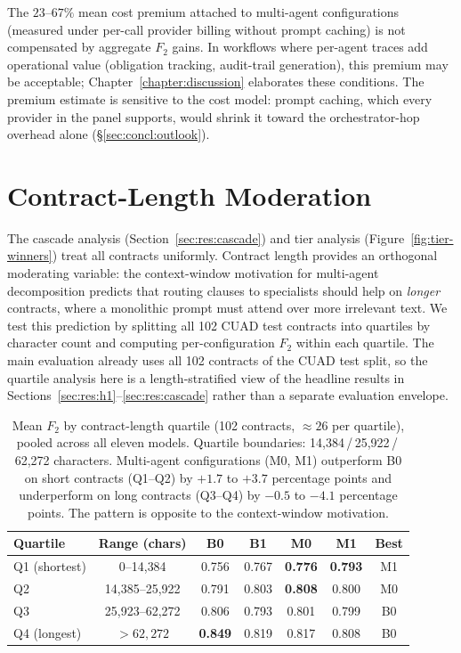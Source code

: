 The $23$--$67\%$ mean cost premium attached to multi-agent configurations
(measured under per-call provider billing without prompt caching) is not
compensated by aggregate $F_2$ gains. In workflows where per-agent traces add
operational value (obligation tracking, audit-trail generation), this premium
may be acceptable; Chapter~\ref{chapter:discussion} elaborates these conditions.
The premium estimate is sensitive to the cost model: prompt caching, which every
provider in the panel supports, would shrink it toward the orchestrator-hop
overhead alone (\S\ref{sec:concl:outlook}).

\section{Contract-Length Moderation}\label{sec:res:length}

The cascade analysis (Section~\ref{sec:res:cascade}) and tier analysis
(Figure~\ref{fig:tier-winners}) treat all contracts uniformly. Contract length
provides an orthogonal moderating variable: the context-window motivation for
multi-agent decomposition predicts that routing clauses to specialists should
help on \emph{longer} contracts, where a monolithic prompt must attend over
more irrelevant text. We test this prediction by splitting all 102 CUAD test contracts into quartiles
by character count and computing per-configuration $F_2$ within each quartile.
The main evaluation already uses all 102 contracts of the CUAD test split, so the
quartile analysis here is a length-stratified view of the headline results in
Sections~\ref{sec:res:h1}--\ref{sec:res:cascade} rather than a separate evaluation
envelope.

\begin{table}[htbp]
  \centering
  \small
  \caption{Mean $F_2$ by contract-length quartile (102 contracts, ${\approx}26$
  per quartile), pooled across all eleven models. Quartile boundaries:
  14{,}384\,/\,25{,}922\,/\,62{,}272 characters. Multi-agent configurations
  (M0, M1) outperform B0 on short contracts (Q1--Q2) by $+1.7$ to $+3.7$
  percentage points and underperform on long contracts (Q3--Q4) by $-0.5$ to
  $-4.1$ percentage points. The pattern is opposite to the context-window
  motivation.}
  \label{tab:length-quartile}
  \begin{tabular*}{\linewidth}{@{\extracolsep{\fill}}lcccccc@{}}
    \toprule
    \textbf{Quartile} & \textbf{Range (chars)} & \textbf{B0} & \textbf{B1} &
    \textbf{M0} & \textbf{M1} & \textbf{Best} \\
    \midrule
    Q1 (shortest) & 0--14{,}384    & 0.756 & 0.767 & \textbf{0.776} & \textbf{0.793} & M1 \\
    Q2            & 14{,}385--25{,}922 & 0.791 & 0.803 & \textbf{0.808} & 0.800 & M0 \\
    Q3            & 25{,}923--62{,}272 & 0.806 & 0.793 & 0.801 & 0.799 & B0 \\
    Q4 (longest)  & ${>}62{,}272$  & \textbf{0.849} & 0.819 & 0.817 & 0.808 & B0 \\
    \bottomrule
  \end{tabular*}
\end{table}

